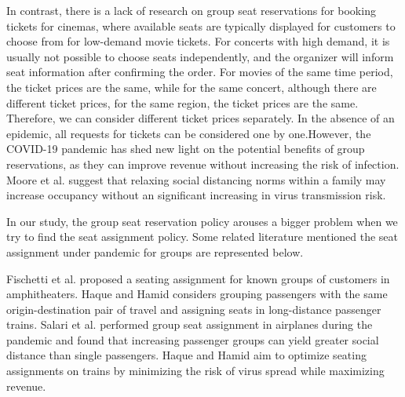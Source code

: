 In contrast, there is a lack of research on group seat reservations for booking tickets for cinemas, where available seats are typically displayed for customers to choose from for low-demand movie tickets. For concerts with high demand, it is usually not possible to choose seats independently, and the organizer will inform seat information after confirming the order. 
For movies of the same time period, the ticket prices are the same, while for the same concert, although there are different ticket prices, for the same region, the ticket prices are the same. Therefore, we can consider different ticket prices separately. 
In the absence of an epidemic, all requests for tickets can be considered one by one.However, the COVID-19 pandemic has shed new light on the potential benefits of group reservations, as they can improve revenue without increasing the risk of infection. Moore et al. \cite{moore2021seat} suggest that relaxing social distancing norms within a family may increase occupancy without an significant increasing in virus transmission risk.


In our study, the group seat reservation policy arouses a bigger problem when we try to find the seat assignment policy. Some related literature mentioned the seat assignment under pandemic for groups are represented below.

Fischetti et al. \cite{fischetti2021safe} proposed a seating assignment for known groups of customers in amphitheaters. Haque and Hamid \cite{haque2022optimization} considers grouping passengers with the same origin-destination pair of travel and assigning seats in long-distance passenger trains. Salari et al. \cite{salari2022social} performed group seat assignment in airplanes during the pandemic and found that increasing passenger groups can yield greater social distance than single passengers. Haque and Hamid \cite{haque2023social} aim to optimize seating assignments on trains by minimizing the risk of virus spread while maximizing revenue. 

